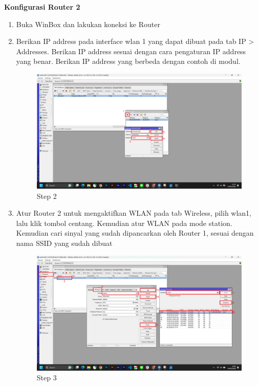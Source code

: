 \begin{center}
	\textbf{Konfigurasi Router 2}
	\begin{enumerate}
		\item Buka WinBox dan lakukan koneksi ke Router
		\item Berikan IP address pada interface wlan 1 yang dapat dibuat pada tab IP > Addresses. Berikan IP address sesuai dengan cara pengaturan IP address yang benar. Berikan IP address yang berbeda dengan contoh di modul.
		\begin{figure}[H]
			\centering
			\includegraphics[width=0.9\linewidth]{P1/img/per1/pc2/Step 2.png}
			\caption{Step 2}
			\label{fig:Step 2(Per.1 PC2)}
		\end{figure}
		\item Atur Router 2 untuk mengaktifkan WLAN pada tab Wireless, pilih wlan1, lalu klik tombol centang. Kemudian atur WLAN pada mode station. Kemudian cari sinyal yang sudah dipancarkan oleh Router 1, sesuai dengan nama SSID yang sudah dibuat
		\begin{figure}[H]
			\centering
			\includegraphics[width=0.9\linewidth]{P1/img/per1/pc2/Step 3.png}
			\caption{Step 3}
			\label{fig:Step 3(Per.1 PC2)}
		\end{figure}
	\end{enumerate}
	                              

\end{center}
